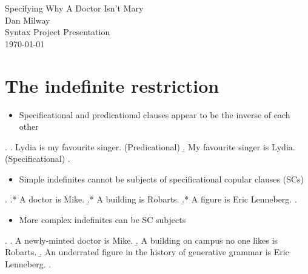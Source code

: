 \documentclass[letterpaper]{article}
\begin{document}
\begin{center}
  {\Large Specifying Why A Doctor Isn't Mary\\}
  {\large Dan Milway}\\
  Syntax Project Presentation\\
  \today
\end{center}
\section{The indefinite restriction}
\begin{itemize}
  \item Specificational and predicational clauses appear to be the inverse of each other
\end{itemize}
\ex.
\a. Lydia is my favourite singer. (Predicational)
\b. My favourite singer is Lydia. (Specificational)
\z.

\begin{itemize}
  \item Simple indefinites cannot be subjects of specificational copular clauses (SCs)
\end{itemize}
\ex.\label{ex:BadSCs}
\a.* A doctor is Mike.
\b.* A building is Robarts.
\b.* A figure is Eric Lenneberg.
\z.

\begin{itemize}
  \item More complex indefinites can be SC subjects
\end{itemize}
\ex.\label{ex:GoodSCs}
\a. A newly-minted doctor is Mike.
\b. A building on campus no one likes is Robarts.
\b. An underrated figure in the history of generative grammar is Eric Lenneberg.
\z.
\end{document}
